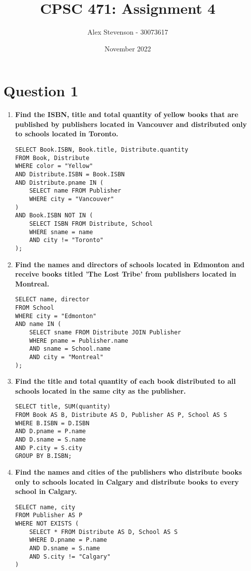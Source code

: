 \documentclass{article}
\title{CPSC 471: Assignment 4}
\author{Alex Stevenson - 30073617}
\date{November 2022}
\begin{document}
\maketitle

\section*{Question 1}

\begin{enumerate}
\item \textbf{Find the ISBN, title and total quantity of yellow books that are published by publishers located in Vancouver and distributed only to schools located in Toronto.}
\begin{verbatim}
SELECT Book.ISBN, Book.title, Distribute.quantity 
FROM Book, Distribute 
WHERE color = "Yellow" 
AND Distribute.ISBN = Book.ISBN 
AND Distribute.pname IN (
    SELECT name FROM Publisher 
    WHERE city = "Vancouver"
) 
AND Book.ISBN NOT IN (
    SELECT ISBN FROM Distribute, School 
    WHERE sname = name 
    AND city != "Toronto"
);
\end{verbatim}

\item \textbf{Find the names and directors of schools located in Edmonton and receive books titled 'The Lost Tribe' from publishers located in Montreal.}
\begin{verbatim}
SELECT name, director 
FROM School 
WHERE city = "Edmonton" 
AND name IN (
    SELECT sname FROM Distribute JOIN Publisher 
    WHERE pname = Publisher.name 
    AND sname = School.name 
    AND city = "Montreal"
);
\end{verbatim}

\item \textbf{Find the title and total quantity of each book distributed to all schools located in the same city as the publisher.}
\begin{verbatim}
SELECT title, SUM(quantity) 
FROM Book AS B, Distribute AS D, Publisher AS P, School AS S 
WHERE B.ISBN = D.ISBN 
AND D.pname = P.name 
AND D.sname = S.name 
AND P.city = S.city 
GROUP BY B.ISBN;
\end{verbatim}

\newpage
\item \textbf{Find the names and cities of the publishers who distribute books only to schools located in Calgary and distribute books to every school in Calgary.}
\begin{verbatim}
SELECT name, city 
FROM Publisher AS P 
WHERE NOT EXISTS (
    SELECT * FROM Distribute AS D, School AS S 
    WHERE D.pname = P.name 
    AND D.sname = S.name 
    AND S.city != "Calgary"
)


\end{verbatim}
\end{enumerate}
\end{document}
